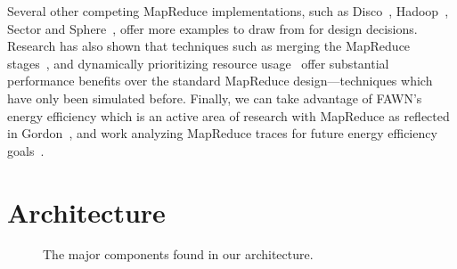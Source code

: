 \documentclass[10pt,letter,final,article,twocolumn]{article} %
\begin{document}
Several other competing MapReduce implementations, such as
Disco~\cite{disco10}, Hadoop~\cite{hadoop10}, Sector and
Sphere~\cite{sphere09}, offer more examples to draw from for design
decisions.  Research has also shown that techniques such as merging the
MapReduce stages~\cite{barrier10}, and dynamically prioritizing resource
usage~\cite{sandholm09} offer substantial performance benefits over the
standard MapReduce design---techniques which have only been simulated
before.  Finally, we can take advantage of FAWN's energy efficiency which is
an active area of research with MapReduce as reflected in
Gordon~\cite{gordon09},  and work analyzing MapReduce traces for future
energy efficiency goals~\cite{chen10}.

\section{Architecture}

\begin{figure}[htbp]
\begin{center}
\caption{The major components found in our architecture.}
\label{fig:arch}
\end{center}
\end{figure}
\end{document}
